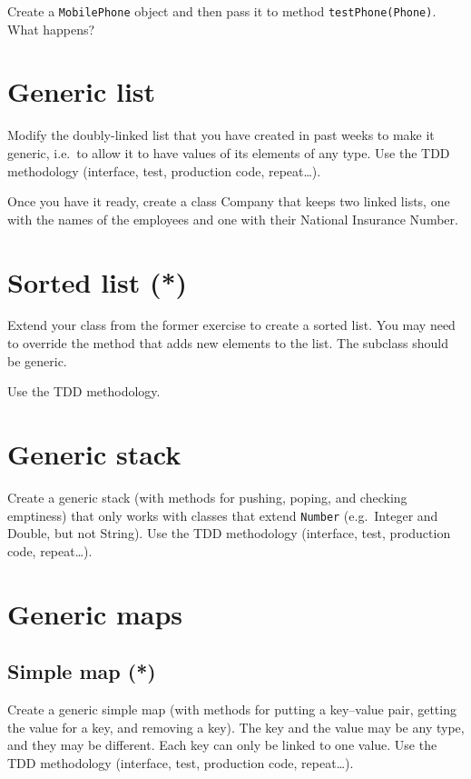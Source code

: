 \documentclass{article}
\begin{document}
Create a \verb+MobilePhone+ object and then pass it to method
\verb+testPhone(Phone)+. What happens?

\section{Generic list}
\label{sec:generic-list}

Modify the doubly-linked list that you have created in past weeks to make it
generic, i.e.~to allow it to have values of its elements of any
type. Use the TDD methodology (interface, test, production code,
repeat\ldots).

Once you have it ready, create a class Company that keeps two linked
lists, one with the names of the employees and one with their National
Insurance Number. 

\section{Sorted list (*)}
\label{sec:sorted-list}

Extend your class from the former exercise to create a sorted
list. You may need to override the method that adds new elements to
the list. The subclass should be generic. 


Use the TDD methodology.

\section{Generic stack}
\label{sec:generic-stack}

Create a generic stack (with methods for pushing, poping, and checking
emptiness) that only works with classes that extend \verb+Number+
(e.g.~Integer and Double, but not String). Use the TDD methodology
(interface, test, production code, repeat\ldots).

\section{Generic maps}
\label{sec:generic-map}

\subsection{Simple map (*)}
\label{sec:array-based-impl2}

Create a generic simple map (with methods for putting a key--value pair,
getting the value for a key, and removing a key). The key and the
value may be any type, and they may be different. Each key can only be
linked to one value. 
Use the TDD methodology
(interface, test, production code, repeat\ldots).
\end{document}
